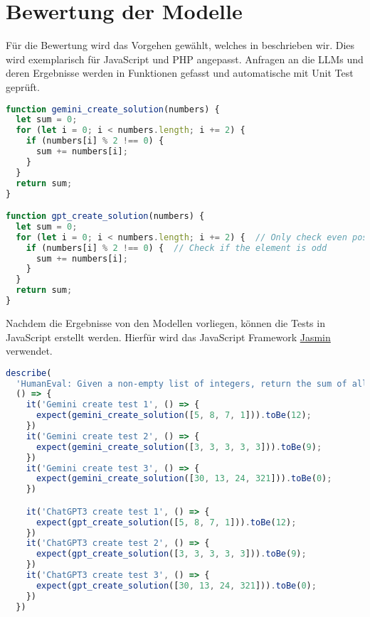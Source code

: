 \section{Bewertung der Modelle}
Für die Bewertung wird das Vorgehen gewählt, welches in \cite{chen-2021} beschrieben wir. Dies wird exemplarisch für JavaScript und PHP angepasst. Anfragen an die LLMs und deren Ergebnisse werden in Funktionen gefasst und automatische mit Unit Test geprüft.

\begin{lstlisting}[language=javascript,caption={JavaScript Ergebnise der Modelle (gekürzt)}]
function gemini_create_solution(numbers) {
  let sum = 0;
  for (let i = 0; i < numbers.length; i += 2) {
    if (numbers[i] % 2 !== 0) {
      sum += numbers[i];
    }
  }
  return sum;
}

function gpt_create_solution(numbers) {
  let sum = 0;
  for (let i = 0; i < numbers.length; i += 2) {  // Only check even positions (0, 2, 4, ...)
    if (numbers[i] % 2 !== 0) {  // Check if the element is odd
      sum += numbers[i];
    }
  }
  return sum;
}
\end{lstlisting}

Nachdem die Ergebnisse von den Modellen vorliegen, können die Tests in JavaScript erstellt werden. Hierfür wird das JavaScript Framework \href{https://jasmine.github.io/}{Jasmin} verwendet.

\begin{lstlisting}[language=javascript,caption={JavaScript: Unit Test der Ergebnise}]
describe(
  'HumanEval: Given a non-empty list of integers, return the sum of all of the odd elements that are in even positions.',
  () => {
    it('Gemini create test 1', () => {
      expect(gemini_create_solution([5, 8, 7, 1])).toBe(12);
    })
    it('Gemini create test 2', () => {
      expect(gemini_create_solution([3, 3, 3, 3, 3])).toBe(9);
    })
    it('Gemini create test 3', () => {
      expect(gemini_create_solution([30, 13, 24, 321])).toBe(0);
    })

    it('ChatGPT3 create test 1', () => {
      expect(gpt_create_solution([5, 8, 7, 1])).toBe(12);
    })
    it('ChatGPT3 create test 2', () => {
      expect(gpt_create_solution([3, 3, 3, 3, 3])).toBe(9);
    })
    it('ChatGPT3 create test 3', () => {
      expect(gpt_create_solution([30, 13, 24, 321])).toBe(0);
    })
  })

\end{lstlisting}

